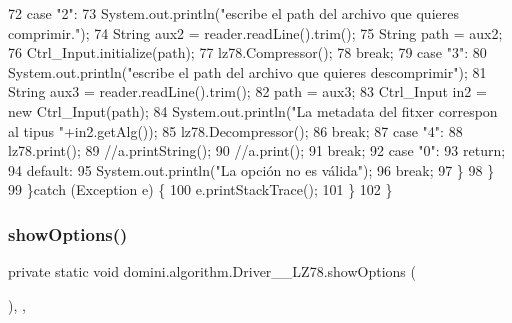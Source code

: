 \begin{DoxyCode}
72                 \textcolor{keywordflow}{case} \textcolor{stringliteral}{"2"}:
73                     System.out.println(\textcolor{stringliteral}{"escribe el path del archivo que quieres comprimir."});
74                     String aux2 = reader.readLine().trim();
75                     String path = aux2;
76                     Ctrl\_Input.initialize(path);
77                     lz78.Compressor();
78                 \textcolor{keywordflow}{break};
79                 \textcolor{keywordflow}{case} \textcolor{stringliteral}{"3"}:
80                     System.out.println(\textcolor{stringliteral}{"escribe el path del archivo que quieres descomprimir"});
81                     String aux3 = reader.readLine().trim();
82                     path = aux3;
83                     Ctrl\_Input in2 = \textcolor{keyword}{new} Ctrl\_Input(path);
84                     System.out.println(\textcolor{stringliteral}{"La metadata del fitxer correspon al tipus "}+in2.getAlg());
85                     lz78.Decompressor();
86                 \textcolor{keywordflow}{break};
87                 \textcolor{keywordflow}{case} \textcolor{stringliteral}{"4"}:
88                     lz78.print();
89                     \textcolor{comment}{//a.printString();}
90                     \textcolor{comment}{//a.print();}
91                 \textcolor{keywordflow}{break};
92                 \textcolor{keywordflow}{case} \textcolor{stringliteral}{"0"}:
93                     \textcolor{keywordflow}{return};
94                 \textcolor{keywordflow}{default}:
95                     System.out.println(\textcolor{stringliteral}{"La opción no es válida"});
96                 \textcolor{keywordflow}{break};
97             \}
98         \}
99     \}\textcolor{keywordflow}{catch} (Exception e) \{
100         e.printStackTrace();
101     \}
102     \}
\end{DoxyCode}
\mbox{\label{classdomini_1_1algorithm_1_1Driver____LZ78_af5e77bd40dbe6c3fa84ee5ee996b6dfe}} 
\subsubsection{\texorpdfstring{show\+Options()}{showOptions()}}
{\footnotesize\ttfamily private static void domini.\+algorithm.\+Driver\+\_\+\+\_\+\+L\+Z78.\+show\+Options (\begin{DoxyParamCaption}{ }\end{DoxyParamCaption})\hspace{0.3cm}{\ttfamily [inline]}, {\ttfamily [static]}, {\ttfamily [private]}}



